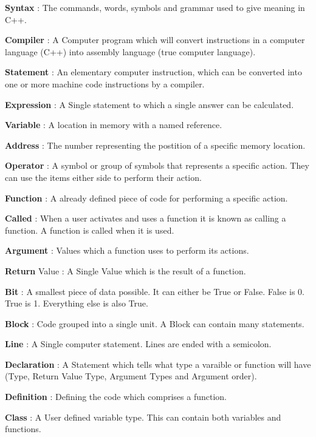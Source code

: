 \begin{DoxyItemize}
\item {\bfseries Syntax} : The commands, words, symbols and grammar used to give meaning in C++.
\item {\bfseries Compiler} : A Computer program which will convert instructions in a computer language (C++) into assembly language (true computer language).
\item {\bfseries Statement} : An elementary computer instruction, which can be converted into one or more machine code instructions by a compiler.
\item {\bfseries Expression} : A Single statement to which a single answer can be calculated.
\item {\bfseries Variable} : A location in memory with a named reference.
\item {\bfseries Address} : The number representing the postition of a specific memory location.
\item {\bfseries Operator} : A symbol or group of symbols that represents a specific action. They can use the items either side to perform their action.
\item {\bfseries Function} : A already defined piece of code for performing a specific action.
\item {\bfseries Called} : When a user activates and uses a function it is known as calling a function. A function is called when it is used.
\item {\bfseries Argument} : Values which a function uses to perform its actions.
\item {\bfseries Return} Value : A Single Value which is the result of a function.
\item {\bfseries Bit} : A smallest piece of data possible. It can either be True or False. False is 0. True is 1. Everything else is also True.
\item {\bfseries Block} : Code grouped into a single unit. A Block can contain many statements.
\item {\bfseries Line} : A Single computer statement. Lines are ended with a semicolon.
\item {\bfseries Declaration} : A Statement which tells what type a varaible or function will have (Type, Return Value Type, Argument Types and Argument order).
\item {\bfseries Definition} : Defining the code which comprises a function.
\item {\bfseries Class} : A User defined variable type. This can contain both variables and functions.

\end{DoxyItemize}
